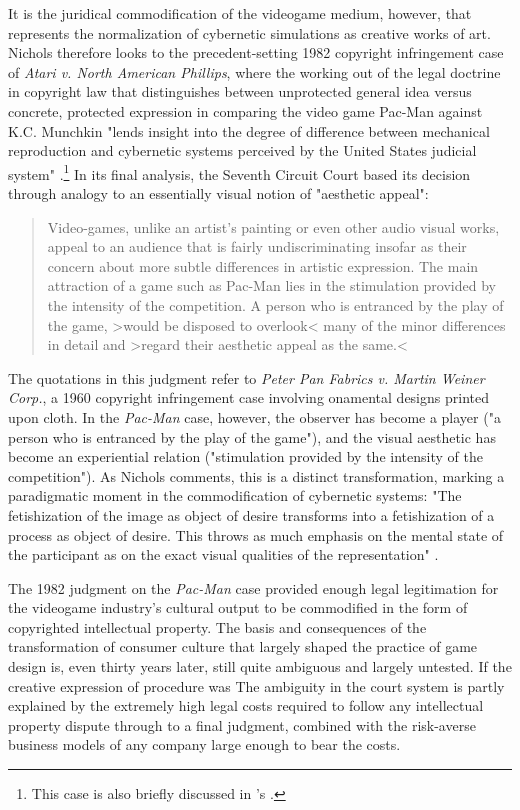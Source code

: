It is the juridical commodification of the videogame medium, however, that represents the normalization of cybernetic simulations as creative works of art. Nichols therefore looks to the precedent-setting 1982 copyright infringement case of \emph{Atari v. North American Phillips}, where the working out of the legal doctrine in copyright law that distinguishes between unprotected general idea versus concrete, protected expression in comparing the video game Pac-Man against K.C. Munchkin "lends insight into the degree of difference between mechanical reproduction and cybernetic systems perceived by the United States judicial system" \autocite[41--2]{Nichols1988}.\footnote{
  This case is also briefly discussed in \citeauthor{Siva2001}'s  \autocite[168--70]{Siva2001}.
}
In its final analysis, the Seventh Circuit Court based its decision through analogy to an essentially visual notion of "aesthetic appeal":
\blockcquote[qtd. in][42]{Nichols1988}{
  Video-games, unlike an artist's painting or even other audio visual works, appeal to an audience that is fairly undiscriminating insofar as their concern about more subtle differences in artistic expression. The main attraction of a game such as Pac-Man lies in the stimulation provided by the intensity of the competition. A person who is entranced by the play of the game, >would be disposed to overlook< many of the minor differences in detail and >regard their aesthetic appeal as the same.<
}

The quotations in this judgment refer to \emph{Peter Pan Fabrics v. Martin Weiner Corp.}, a 1960 copyright infringement case involving onamental designs printed upon cloth. In the \emph{Pac-Man} case, however, the observer has become a player ("a person who is entranced by the play of the game"), and the visual aesthetic has become an experiential relation ("stimulation provided by the intensity of the competition"). As Nichols comments, this is a distinct transformation, marking a paradigmatic moment in the commodification of cybernetic systems: "The fetishization of the image as object of desire transforms into a fetishization of a process as object of desire. This throws as much emphasis on the mental state of the participant as on the exact visual qualities of the representation" \autocite[43]{Nichols1988}.

The 1982 judgment on the \emph{Pac-Man} case provided enough legal legitimation for the videogame industry's cultural output to be commodified in the form of copyrighted intellectual property. The basis and consequences of the transformation of consumer culture that largely shaped the practice of game design is, even thirty years later, still quite ambiguous and largely untested. If the creative expression of procedure was  The ambiguity in the court system is partly explained by the extremely high legal costs required to follow any intellectual property dispute through to a final judgment, combined with the risk-averse business models of any company large enough to bear the costs.

